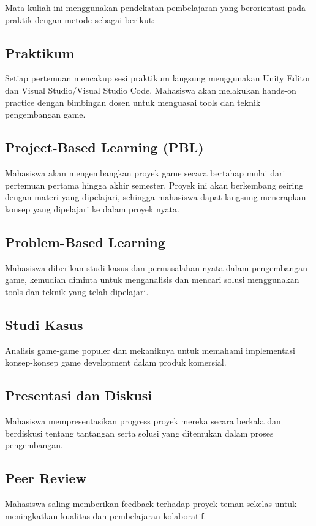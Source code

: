 \documentclass[a4paper,12pt]{article}
\begin{document}
Mata kuliah ini menggunakan pendekatan pembelajaran yang berorientasi pada praktik dengan metode sebagai berikut:

\subsection{Praktikum}
Setiap pertemuan mencakup sesi praktikum langsung menggunakan Unity Editor dan Visual Studio/Visual Studio Code. Mahasiswa akan melakukan hands-on practice dengan bimbingan dosen untuk menguasai tools dan teknik pengembangan game.

\subsection{Project-Based Learning (PBL)}
Mahasiswa akan mengembangkan proyek game secara bertahap mulai dari pertemuan pertama hingga akhir semester. Proyek ini akan berkembang seiring dengan materi yang dipelajari, sehingga mahasiswa dapat langsung menerapkan konsep yang dipelajari ke dalam proyek nyata.

\subsection{Problem-Based Learning}
Mahasiswa diberikan studi kasus dan permasalahan nyata dalam pengembangan game, kemudian diminta untuk menganalisis dan mencari solusi menggunakan tools dan teknik yang telah dipelajari.

\subsection{Studi Kasus}
Analisis game-game populer dan mekaniknya untuk memahami implementasi konsep-konsep game development dalam produk komersial.

\subsection{Presentasi dan Diskusi}
Mahasiswa mempresentasikan progress proyek mereka secara berkala dan berdiskusi tentang tantangan serta solusi yang ditemukan dalam proses pengembangan.

\subsection{Peer Review}
Mahasiswa saling memberikan feedback terhadap proyek teman sekelas untuk meningkatkan kualitas dan pembelajaran kolaboratif.
\end{document}
